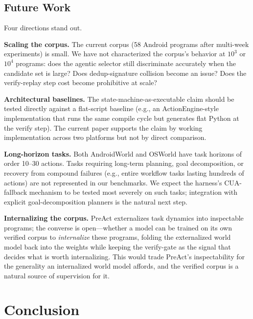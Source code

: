 \documentclass[11pt]{article}
\begin{document}
\subsection{Future Work}
\label{sec:future-work}

Four directions stand out.

\textbf{Scaling the corpus.} The current corpus (58 Android programs after multi-week experiments) is small. We have not characterized the corpus's behavior at $10^3$ or $10^4$ programs: does the agentic selector still discriminate accurately when the candidate set is large? Does dedup-signature collision become an issue? Does the verify-replay step cost become prohibitive at scale?

\textbf{Architectural baselines.} The state-machine-as-executable claim should be tested directly against a flat-script baseline (e.g., an ActionEngine-style implementation that runs the same compile cycle but generates flat Python at the verify step). The current paper supports the claim by working implementation across two platforms but not by direct comparison.

\textbf{Long-horizon tasks.} Both AndroidWorld and OSWorld have task horizons of order 10--30 actions. Tasks requiring long-term planning, goal decomposition, or recovery from compound failures (e.g., entire workflow tasks lasting hundreds of actions) are not represented in our benchmarks. We expect the harness's CUA-fallback mechanism to be tested most severely on such tasks; integration with explicit goal-decomposition planners is the natural next step.

\textbf{Internalizing the corpus.} PreAct externalizes task dynamics into inspectable programs; the converse is open---whether a model can be trained on its own verified corpus to \emph{internalize} these programs, folding the externalized world model back into the weights while keeping the verify-gate as the signal that decides what is worth internalizing. This would trade PreAct's inspectability for the generality an internalized world model affords, and the verified corpus is a natural source of supervision for it.

\section{Conclusion}
\label{sec:conclusion}
\end{document}
